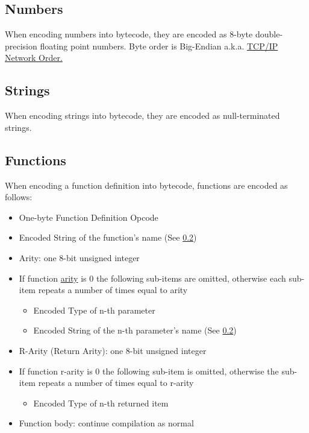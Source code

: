 \documentclass{article}
\begin{document}
\subsection{Numbers}
When encoding numbers into bytecode, they are encoded as 8-byte double-precision floating point numbers. Byte order is Big-Endian a.k.a. \href{https://www.rfc-editor.org/rfc/rfc1700}{TCP/IP Network Order.}

\subsection{Strings} \label{ssec:stringencode}
When encoding strings into bytecode, they are encoded as null-terminated strings.

\subsection{Functions}
When encoding a function definition into bytecode, functions are encoded as follows:
\begin{itemize}
	\item One-byte Function Definition Opcode
	\item Encoded String of the function's name (See \ref{ssec:stringencode})
	\item Arity: one 8-bit unsigned integer
	\item If function \href{https://en.wikipedia.org/wiki/Arity}{arity} is 0 the following sub-items are omitted, otherwise each sub-item repeats a number of times equal to arity
		\begin{itemize}
			\item Encoded Type of n-th parameter
			\item Encoded String of the n-th parameter's name (See \ref{ssec:stringencode})
		\end{itemize}
	\item R-Arity (Return Arity): one 8-bit unsigned integer
	\item If function r-arity is 0 the following sub-item is omitted, otherwise the sub-item repeats a number of times equal to r-arity
		\begin{itemize}
			\item Encoded Type of n-th returned item
		\end{itemize}
	\item Function body: continue compilation as normal
\end{itemize}
\end{document}
